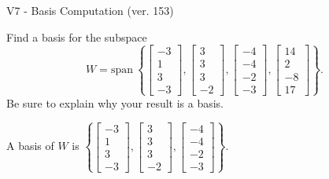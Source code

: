 \begin{exercise}
  \begin{exerciseTitle}V7 - Basis Computation (ver. 153)\end{exerciseTitle}
  \begin{exerciseStatement}
    Find a basis for the subspace 
\[W=\mathrm{span}\ \left\{\left[\begin{array}{r}
-3 \\
1 \\
3 \\
-3
\end{array}\right] , \left[\begin{array}{r}
3 \\
3 \\
3 \\
-2
\end{array}\right] , \left[\begin{array}{r}
-4 \\
-4 \\
-2 \\
-3
\end{array}\right] , \left[\begin{array}{r}
14 \\
2 \\
-8 \\
17
\end{array}\right]\right\}.\]
 Be sure to explain why your result is a basis.


  \end{exerciseStatement}
  \begin{exerciseAnswer}
   A basis of \(W\) is  \(\left\{\left[\begin{array}{r}
-3 \\
1 \\
3 \\
-3
\end{array}\right] , \left[\begin{array}{r}
3 \\
3 \\
3 \\
-2
\end{array}\right] , \left[\begin{array}{r}
-4 \\
-4 \\
-2 \\
-3
\end{array}\right]\right\}\).
  


  \end{exerciseAnswer}
\end{exercise}